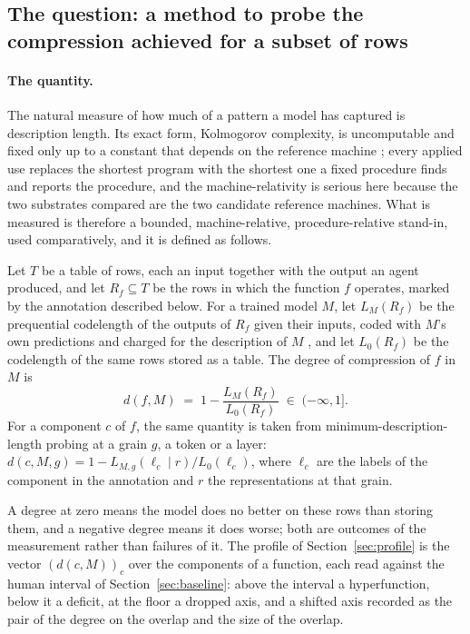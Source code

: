 \subsection{The question: a method to probe the compression achieved for a subset of rows}
\label{sec:quantity}
\label{sec:measure}
\label{sec:memorization}
\label{sec:twomeasurements}
\label{sec:method}

\paragraph{The quantity.}
The natural measure of how much of a pattern a model has captured is description length. Its exact
form, Kolmogorov complexity, is uncomputable and fixed only up to a constant that depends on the
reference machine \citep{livitanyi2019}; every applied use replaces the shortest program with the
shortest one a fixed procedure finds and reports the procedure, and the machine-relativity is serious
here because the two substrates compared are the two candidate reference machines. What is measured
is therefore a bounded, machine-relative, procedure-relative stand-in, used comparatively, and it is
defined as follows.

\begin{definition}
\label{def:degree}
Let $T$ be a table of rows, each an input together with the output an agent produced, and let
$R_f \subseteq T$ be the rows in which the function $f$ operates, marked by the annotation described
below. For a trained model $M$, let $L_M(R_f)$ be the prequential codelength of the outputs of $R_f$
given their inputs, coded with $M$'s own predictions and charged for the description of $M$
\citep{blier2018}, and let $L_0(R_f)$ be the codelength of the same rows stored as a table. The degree
of compression of $f$ in $M$ is
\[
  d(f, M) \;=\; 1 - \frac{L_M(R_f)}{L_0(R_f)} \;\in\; (-\infty, 1].
\]
For a component $c$ of $f$, the same quantity is taken from minimum-description-length probing
\citep{voita2020} at a grain $g$, a token or a layer:
$d(c, M, g) = 1 - L_{M,g}(\ell_c \mid r)/L_0(\ell_c)$, where $\ell_c$ are the labels of the component in
the annotation and $r$ the representations at that grain.
\end{definition}

A degree at zero means the model does no better on these rows than storing them, and a negative degree
means it does worse; both are outcomes of the measurement rather than failures of it. The profile of
Section~\ref{sec:profile} is the vector $(d(c,M))_c$ over the components of a function, each read
against the human interval of Section~\ref{sec:baseline}: above the interval a hyperfunction, below it a
deficit, at the floor a dropped axis, and a shifted axis recorded as the pair of the degree on the
overlap and the size of the overlap.

